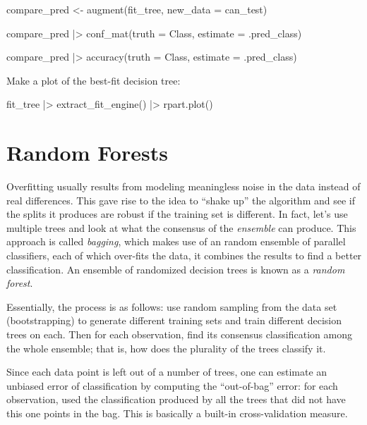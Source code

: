 \documentclass[
  letterpaper,
  DIV=11,
  numbers=noendperiod]{scrreprt}
\newenvironment{Shaded}{\begin{snugshade}}{\end{snugshade}}
\newcommand{\NormalTok}[1]{\textcolor[rgb]{0.00,0.23,0.31}{#1}}
\begin{document}
\begin{Shaded}
\begin{Highlighting}[]
\NormalTok{compare\_pred \textless{}{-} augment(fit\_tree, new\_data = can\_test) }

\NormalTok{compare\_pred |\textgreater{} conf\_mat(truth = Class, estimate = .pred\_class)}

\NormalTok{compare\_pred |\textgreater{}  accuracy(truth = Class, estimate = .pred\_class)}
\end{Highlighting}
\end{Shaded}

Make a plot of the best-fit decision tree:

\begin{Shaded}
\begin{Highlighting}[]
\NormalTok{fit\_tree |\textgreater{}}
\NormalTok{  extract\_fit\_engine() |\textgreater{}}
\NormalTok{  rpart.plot()}
\end{Highlighting}
\end{Shaded}

\section{Random Forests}\label{random-forests}

Overfitting usually results from modeling meaningless noise in the data
instead of real differences. This gave rise to the idea to ``shake up''
the algorithm and see if the splits it produces are robust if the
training set is different. In fact, let's use multiple trees and look at
what the consensus of the \emph{ensemble} can produce. This approach is
called \emph{bagging}, which makes use of an random ensemble of parallel
classifiers, each of which over-fits the data, it combines the results
to find a better classification. An ensemble of randomized decision
trees is known as a \emph{random forest}.

Essentially, the process is as follows: use random sampling from the
data set (bootstrapping) to generate different training sets and train
different decision trees on each. Then for each observation, find its
consensus classification among the whole ensemble; that is, how does the
plurality of the trees classify it.

Since each data point is left out of a number of trees, one can estimate
an unbiased error of classification by computing the ``out-of-bag''
error: for each observation, used the classification produced by all the
trees that did not have this one points in the bag. This is basically a
built-in cross-validation measure.
\end{document}
